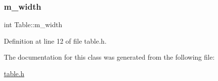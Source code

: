 \subsubsection{\texorpdfstring{m\+\_\+width}{m\_width}}
{\footnotesize\ttfamily int Table\+::m\+\_\+width\hspace{0.3cm}{\ttfamily [protected]}}



Definition at line 12 of file table.\+h.



The documentation for this class was generated from the following file\+:\begin{DoxyCompactItemize}
\item 
\mbox{\hyperlink{table_8h}{table.\+h}}\end{DoxyCompactItemize}

